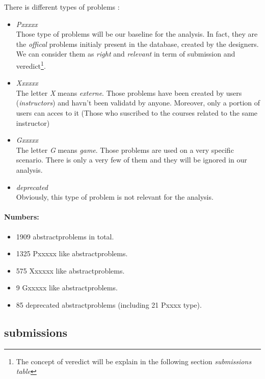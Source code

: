 \documentclass[../main.tex]{subfiles}
\begin{document}
There is different types of problems :
\begin{itemize}
	\setlength\itemsep{0em}
	\item \emph{Pxxxxx}\\
	Those type of problems will be our baseline for the analysis. In fact, they are the \emph{offical} problems initialy present in the database, created by the designers. We can consider them as \emph{right} and \emph{relevant} in term of submission and veredict\footnote{The concept of veredict will be explain in the following section \emph{submissions table}}.

	\item \emph{Xxxxxx}\\
	The letter \emph{X} means \emph{externe}. Those problems have been created by users (\emph{instructors}) and havn't been validatd by anyone. Moreover, only a portion of users can acces to it (Those who suscribed to the courses related to the same instructor)

	\item \emph{Gxxxxx}\\
	The letter \emph{G} means \emph{game}. Those problems are used on a very specific scenario. There is only a very few of them and they will be ignored in our analysis.

	\item \emph{deprecated}\\
	Obviously, this type of problem is not relevant for the analysis. 

\end{itemize}

\paragraph{Numbers:}%
\begin{itemize}
	\setlength\itemsep{0em}
	\item 1909 abstractproblems in total.
	\item 1325 Pxxxxx like abstractproblems.
	\item 575 Xxxxxx like abstractproblems.
	\item 9 Gxxxxx like abstractproblems.
	\item 85 deprecated abstractproblems (including 21 Pxxxx type). 
\end{itemize}

\newpage
\subsection{submissions} %
\label{sub:submissions}
\end{document}
